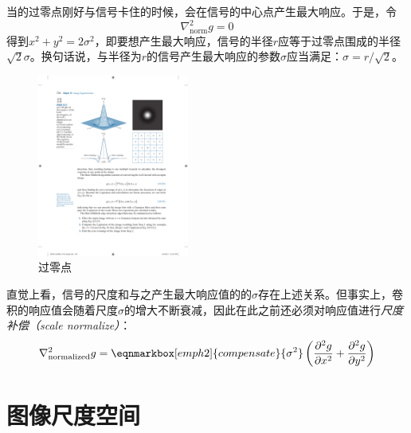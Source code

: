 \begin{intu}
	当\lpl 的过零点刚好与信号卡住的时候，会在信号的中心点产生最大响应。于是，令
	\begin{equation*}
		\nabla^2_{\text{norm}}g = 0
	\end{equation*}
	得到$x^2+y^2=2\sigma^2$，即要想产生最大响应，信号的半径$r$应等于\lpl 过零点围成的半径$\sqrt{2}\sigma$。换句话说，与半径为$r$的信号产生最大响应的\lpl 参数$\sigma$应当满足：$\sigma=r / \sqrt{2}$。
	\begin{figure}[H]
		\centering
		\includegraphics[height=6cm]{fig/LoG zero crossings.pdf}
		\caption{\lpl 过零点}
	\end{figure}
\end{intu}

直觉上看，信号的尺度和与之产生最大响应值的\lpl 的$\sigma$存在上述关系。但事实上，卷积的响应值会随着尺度$\sigma$的增大不断衰减，因此在此之前还必须对响应值进行\emph{尺度补偿（scale normalize）}：
\begin{equation}
	\nabla^2_{\text{normalized}}g=\eqnmarkbox[emph2]{compensate}{\sigma^2}\left(\frac{\partial^2 g}{\partial x^2} + \frac{\partial^2 g}{\partial y^2}\right)
\end{equation}

\section{图像尺度空间}

